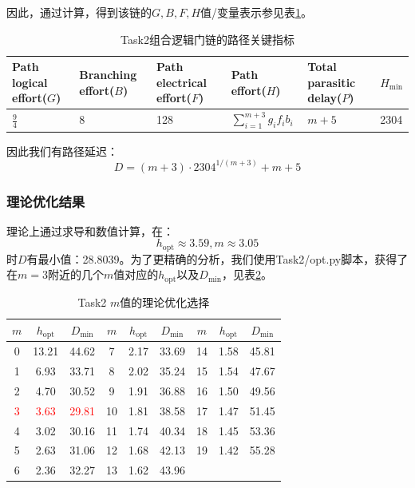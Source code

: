 \documentclass[UTF8,12pt,a4paper]{ctexart}
\begin{document}
因此，通过计算，得到该链的$G,B,F,H$值/变量表示参见表\ref{tab:task2_path_metrics}。

\begin{table}[htbp]
    \centering
    \caption{Task2组合逻辑门链的路径关键指标}
    \label{tab:task2_path_metrics}
    \begin{tabularx}{\linewidth}{XXXXXX}
    \toprule
    Path logical effort($G$) & Branching effort($B$) &
    Path electrical effort($F$) & Path effort($H$) &
    Total parasitic delay($P$) & $H_{\text{min}}$ \\
    \midrule
    $\frac{9}{4}$ & 8 & 128 & $\sum_{i=1}^{m+3}{g_i f_i b_i}$ & $m+5$ & 2304  \\
    \bottomrule
    \end{tabularx}
\end{table}

因此我们有路径延迟：
$$D = (m+3) \cdot 2304^{1/(m+3)} + m + 5$$

\subsubsection{理论优化结果}

理论上通过求导和数值计算，在：
$$h_{\text{opt}} \approx 3.59, m \approx 3.05$$
时$D$有最小值：28.8039。为了更精确的分析，我们使用Task2/opt.py脚本，获得了在$m=3$附近的几个$m$值对应的$h_{\text{opt}}$以及$D_{\text{min}}$，见表\ref{tab:task2_m_opt}。
\begin{table}[htbp]
    \centering
    \caption{Task2 $m$值的理论优化选择}
    \label{tab:task2_m_opt}
    \begin{tabular}{ccc|ccc|ccc}
    \toprule
    $m$ & $h_{\text{opt}}$ & $D_{\text{min}}$ & 
    $m$ & $h_{\text{opt}}$ & $D_{\text{min}}$ & 
    $m$ & $h_{\text{opt}}$ & $D_{\text{min}}$ \\
    \midrule
    0 & 13.21 & 44.62 & 7 & 2.17 & 33.69 & 14 & 1.58 & 45.81 \\
    1 & 6.93 & 33.71 & 8 & 2.02 & 35.24 & 15 & 1.54 & 47.67 \\
    2 & 4.70 & 30.52 & 9 & 1.91 & 36.88 & 16 & 1.50 & 49.56 \\
    \textcolor{red}{3} & \textcolor{red}{3.63} & \textcolor{red}{29.81} & 10 & 1.81 & 38.58 & 17 & 1.47 & 51.45 \\
    4 & 3.02 & 30.16 & 11 & 1.74 & 40.34 & 18 & 1.45 & 53.36 \\
    5 & 2.63 & 31.06 & 12 & 1.68 & 42.13 & 19 & 1.42 & 55.28 \\
    6 & 2.36 & 32.27 & 13 & 1.62 & 43.96 & & & \\
    \bottomrule
    \end{tabular}
\end{table}
\end{document}
